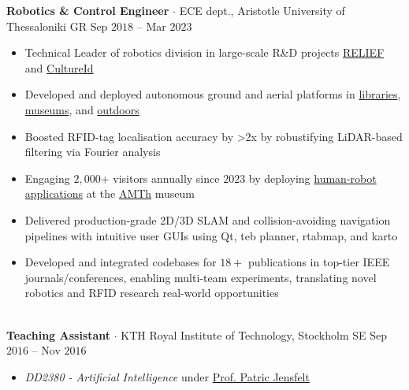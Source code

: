 \documentclass[a4paper,10pt,twoside]{article}
\begin{document}
  \noindent\textbf{Robotics \& Control Engineer} $\cdot$ ECE dept., Aristotle University of Thessaloniki GR \hfill {\small \textcolor{agray}{Sep $2018$ -- Mar $2023$}} \\
  \begin{minipage}[t]{\textwidth}
    \begin{itemize}
      \item Technical Leader of robotics division in large-scale R\&D projects \href{https://relief.web.auth.gr/language/en/home/}{RELIEF} and \href{https://cultureid.web.auth.gr/?page\_id=200&lang=en}{CultureId} \verticalspaceafteritem
      \item Developed and deployed autonomous ground and aerial platforms in \href{https://www.youtube.com/watch?v=bo4lMI640DY}{libraries}, \href{https://youtu.be/2EvTGNOqTrs?t=17}{museums}, and \href{https://www.youtube.com/watch?v=0YFQzpWgEd4}{outdoors}\verticalspaceafteritem
      \item Boosted RFID-tag localisation accuracy by >2x by robustifying LiDAR-based filtering via Fourier analysis\verticalspaceafteritem
      \item Engaging $2,000$+ visitors annually since $2023$ by deploying \href{https://www.youtube.com/watch?v=mrTL3Gep7Xk&t=36s}{human-robot applications} at the \href{https://www.amth.gr/en}{AMTh} museum\verticalspaceafteritem
      \item Delivered production-grade 2D/3D SLAM and collision-avoiding navigation pipelines with intuitive user GUIs using Qt, teb planner, rtabmap, and karto\verticalspaceafteritem
      \item Developed and integrated codebases for $18+$ publications in top-tier IEEE journals/conferences, enabling multi-team experiments, translating novel robotics and RFID research real-world opportunities
    \end{itemize}
  \end{minipage} \\[0.2em]

  \noindent\textbf{Teaching Assistant} $\cdot$ KTH Royal Institute of Technology, Stockholm SE \hfill {\small \textcolor{agray}{Sep $2016$ -- Nov $2016$}} \\
  \begin{minipage}[t]{\textwidth}
    \begin{itemize}
      \item \textit{DD2380 - Artificial Intelligence} under \href{https://www.kth.se/profile/patric}{Prof. Patric Jensfelt}
    \end{itemize}
  \end{minipage} \\[-1em]
\verticalspacebetweensections
\end{document}
